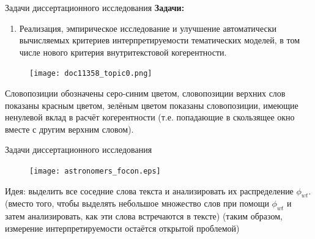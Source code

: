 
\begin{frame}[t]{Задачи диссертационного исследования}
\small
\textbf{Задачи:}
\begin{enumerate}
    \item Реализация, эмпирическое исследование и улучшение автоматически вычисляемых критериев интерпретируемости тематических моделей, в том числе нового критерия внутритекстовой когерентности.
\end{enumerate}

\begin{figure}
        \texttt{[image: doc11358\_topic0.png]} %
\end{figure}
\vspace{-7pt}
Словопозиции обозначены серо-синим цветом, словопозиции верхних слов показаны красным цветом, зелёным цветом показаны словопозиции, имеющие ненулевой вклад в расчёт когерентности (т.е. попадающие в скользящее окно вместе с другим верхним словом).
\normalsize

\end{frame}
\begin{frame}[t]{Задачи диссертационного исследования}
\begin{figure}
   \centering
    \texttt{[image: astronomers\_focon.eps]} %
\end{figure}

Идея: выделить все соседние слова текста и анализировать их распределение $\phi_{wt}$.\\
\medskip
(вместо того, чтобы выделять небольшое множество слов при помощи $\phi_{wt}$ и затем анализировать, как эти слова встречаются в тексте)
\bigskip
\small{(таким образом, измерение интерпретируемости остаётся открытой проблемой)}
\end{frame}


